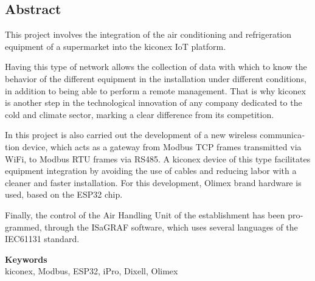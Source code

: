 \begin{otherlanguage}{english}
    \chapter*{Abstract}
  
    This project involves the integration of the air conditioning and refrigeration equipment of a supermarket into the kiconex IoT platform.

    Having this type of network allows the collection of data with which to know the behavior of the different equipment in the installation under different conditions, in addition to being able to perform a remote management. That is why kiconex is another step in the technological innovation of any company dedicated to the cold and climate sector, marking a clear difference from its competition.
    
    In this project is also carried out the development of a new wireless communication device, which acts as a gateway from Modbus TCP frames transmitted via WiFi, to Modbus RTU frames via RS485. A kiconex device of this type facilitates equipment integration by avoiding the use of cables and reducing labor with a cleaner and faster installation. For this development, Olimex brand hardware is used, based on the ESP32 chip.
    
    Finally, the control of the Air Handling Unit of the establishment has been programmed, through the ISaGRAF software, which uses several languages of the IEC61131 standard. 

    \vspace{10mm}

    \begin{center}
    \textbf{\Large{Keywords}} \\
    \vspace{10mm}
    kiconex, Modbus, ESP32, iPro, Dixell, Olimex 
    \end{center}
   \end{otherlanguage}
\clearpage